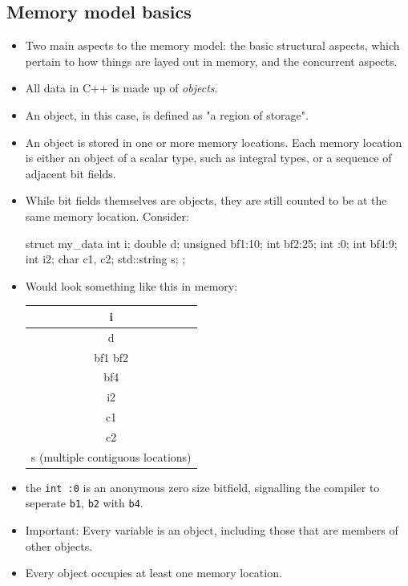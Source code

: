 \documentclass[11pt, a4paper]{article}
\theoremstyle{definition}
\theoremstyle{remark}
\newcommand{\code}[1]{\lstinline|#1|}
\begin{document}
\subsection{Memory model basics}
\begin{itemize}
    \item Two main aspects to the memory model: the basic structural aspects, which pertain to how things are layed out in memory, and the concurrent aspects. 
    \item All data in C++ is made up of \textit{objects}. 
    \item An object, in this case, is defined as "a region of storage". 
    \item An object is stored in one or more memory locations. Each memory location is either an object of a scalar type, such as integral types, or a sequence of adjacent bit fields. 
    \item While bit fields themselves are objects, they are still counted to be at the same memory location. Consider:
\begin{cppcode}
struct my_data {
    int i;
    double d;
    unsigned bf1:10;
    int bf2:25;
    int :0;
    int bf4:9;
    int i2;
    char c1, c2;
    std::string s;
};
\end{cppcode}
    \item Would look something like this in memory:
\begin{center}
    \begin{tabular}{|c|}
        \hline
        i \\
        \hline 
        d \\
        \hline 
        bf1 \vline  bf2 \\
        \hline 
        bf4 \\
        \hline 
        i2 \\
        \hline 
        c1 \\ 
        \hline 
        c2 \\
        \hline 
        s (multiple contiguous locations) \\ 
        \hline
    \end{tabular}
\end{center}
    \item the \code{int :0} is an anonymous zero size bitfield, signalling the compiler to seperate \code{b1}, \code{b2} with \code{b4}.
    \item Important: Every variable is an object, including those that are members of other objects. 
    \item Every object occupies at least one memory location. 

\end{itemize}
\end{document}
